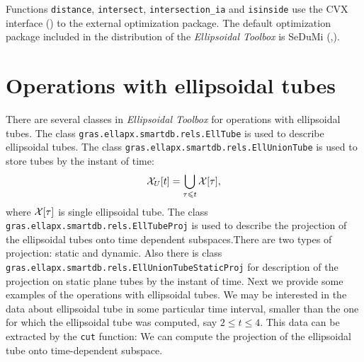 Functions {\tt distance}, {\tt intersect}, {\tt intersection\_ia} and
{\tt isinside} use the CVX interface (\cite{cvxhp}) to the
external optimization package. The default optimization package included
in the distribution of the {\it Ellipsoidal Toolbox} is SeDuMi
(\cite{sedumi},\cite{sedumihp}).
\section{Operations with ellipsoidal tubes}
There are several classes in {\it Ellipsoidal Toolbox} for operations with ellipsoidal tubes. The class {\tt gras.ellapx.smartdb.rels.EllTube} is used
to describe ellipsoidal tubes. The class {\tt gras.ellapx.smartdb.rels.EllUnionTube} is used to store tubes by the instant of time:
$$
\XX_{U}[t]=\bigcup \limits_{\tau\leq t}\XX[\tau],
$$
where $\XX[\tau]$ is single ellipsoidal tube.
\newline
The class {\tt gras.ellapx.smartdb.rels.EllTubeProj} is used to describe the projection of the ellipsoidal tubes onto time dependent subspaces.There are two types of projection: static and dynamic.
Also there is class {\tt gras.ellapx.smartdb.rels.EllUnionTubeStaticProj} for description of the projection on static plane tubes by the instant of time.
\newline
Next we provide some examples of the operations with ellipsoidal tubes.
We may be interested in the data about ellipsoidal tube in some
particular time interval, smaller than the one for which the ellipsoidal tube was
computed, say $2\leq t\leq4$.
This data can be extracted  by the {\tt cut} function:
We can compute the projection of the ellipsoidal tube onto time-dependent subspace.



